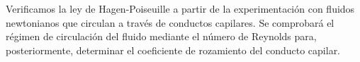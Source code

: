 Verificamos la ley de Hagen-Poiseuille a partir de la experimentación con fluidos newtonianos que circulan a través de conductos capilares. Se comprobará el régimen de circulación del fluido mediante el número de Reynolds para, posteriormente, determinar el coeficiente de rozamiento del conducto capilar.